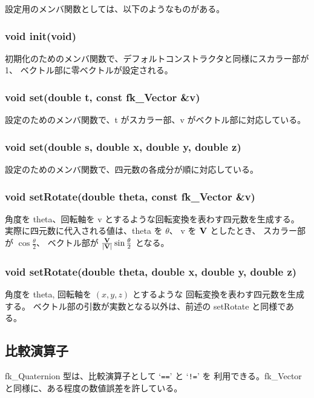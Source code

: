 設定用のメンバ関数としては、以下のようなものがある。

\subsubsection*{void init(void)}
初期化のためのメンバ関数で、デフォルトコンストラクタと同様にスカラー部が 1、
ベクトル部に零ベクトルが設定される。

\subsubsection*{void set(double t, const fk\_Vector \&v)}
設定のためのメンバ関数で、t がスカラー部、v がベクトル部に対応している。

\subsubsection*{void set(double s, double x, double y, double z)}
設定のためのメンバ関数で、四元数の各成分が順に対応している。

\subsubsection*{void setRotate(double theta, const fk\_Vector \&v)}
角度を theta、回転軸を v とするような回転変換を表わす四元数を生成する。
実際に四元数に代入される値は、theta を \(\theta\)、
v を \(\mathbf{V}\) としたとき、
スカラー部が \(\cos\frac{\theta}{2}\)、
ベクトル部が \(\frac{\mathbf{V}}{|\mathbf{V}|}\sin\frac{\theta}{2}\) となる。

\subsubsection*{void setRotate(double theta, double x, double y, double z)}
角度を theta, 回転軸を \((x, y, z)\) とするような
回転変換を表わす四元数を生成する。
ベクトル部の引数が実数となる以外は、前述の setRotate と同様である。

\subsection{比較演算子}
fk\_Quaternion 型は、比較演算子として `\verb+==+' と `\verb+!=+' を
利用できる。fk\_Vector と同様に、ある程度の数値誤差を許している。

